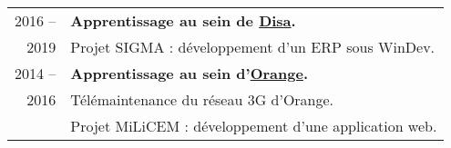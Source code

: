 \begin{supertabular}{rl}
    \textsc{2016 --} & \textbf{Apprentissage au sein de \href{http://www.disa.fr}{Disa}.}\\
    \textsc{2019} & Projet SIGMA : d\'eveloppement d'un ERP sous WinDev.\\[1.5ex]
    \textsc{2014 --} & \textbf{Apprentissage au sein d'\href{https://www.orange.com/en/accueil}{Orange}.}\\
    \textsc{2016} & T\'el\'emaintenance du r\'eseau 3G d'Orange.\\
    & Projet MiLiCEM : d\'eveloppement d'une application web.\\
\end{supertabular}

\medskip
